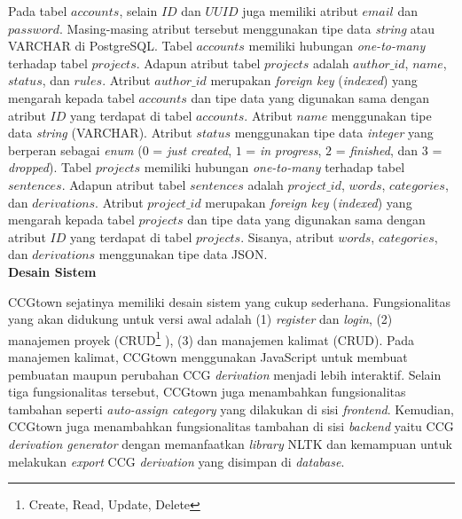 Pada tabel $accounts$, selain $ID$ dan $UUID$ juga memiliki atribut $email$ dan
$password$. Masing-masing atribut tersebut menggunakan tipe data \textit{string}
atau VARCHAR di PostgreSQL.
Tabel $accounts$ memiliki hubungan \textit{one-to-many} terhadap tabel $projects$.
Adapun atribut tabel $projects$ adalah $author\_id$, $name$, $status$, dan $rules$.
Atribut $author\_id$ merupakan \textit{foreign key} (\textit{indexed}) yang
mengarah kepada tabel $accounts$ dan tipe data yang digunakan sama dengan
atribut $ID$ yang terdapat di tabel $accounts$.
Atribut $name$ menggunakan tipe data \textit{string} (VARCHAR).
Atribut $status$ menggunakan tipe data \textit{integer} yang berperan sebagai
\textit{enum} ($0$ = \textit{just created}, $1$ = \textit{in progress},
$2$ = \textit{finished}, dan $3$ = \textit{dropped}).
Tabel $projects$ memiliki hubungan \textit{one-to-many} terhadap tabel $sentences$.
Adapun atribut tabel $sentences$ adalah $project\_id$, $words$, $categories$, dan
$derivations$. Atribut $project\_id$ merupakan \textit{foreign key}
(\textit{indexed}) yang mengarah kepada tabel $projects$ dan tipe data yang digunakan
sama dengan atribut $ID$ yang terdapat di tabel $projects$.
Sisanya, atribut $words$, $categories$, dan $derivations$ menggunakan tipe data JSON.
\\


\noindent\textbf{Desain Sistem}

CCGtown sejatinya memiliki desain sistem yang cukup sederhana.
Fungsionalitas yang akan didukung untuk versi awal adalah (1) \textit{register} dan
\textit{login}, (2) manajemen proyek (CRUD\footnote{Create, Read, Update, Delete}
), (3) dan manajemen kalimat (CRUD).
Pada manajemen kalimat, CCGtown menggunakan JavaScript untuk membuat pembuatan
maupun perubahan CCG \textit{derivation} menjadi lebih interaktif.
Selain tiga fungsionalitas tersebut, CCGtown juga menambahkan fungsionalitas tambahan
seperti \textit{auto-assign category} yang dilakukan di sisi \textit{frontend}.
Kemudian, CCGtown juga menambahkan fungsionalitas tambahan di sisi \textit{backend}
yaitu CCG \textit{derivation generator} dengan memanfaatkan \textit{library} NLTK\citep{NTLKbook}
dan kemampuan untuk melakukan \textit{export} CCG \textit{derivation} yang disimpan
di \textit{database}.

